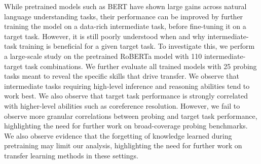 While pretrained models such as BERT have shown large gains across natural language understanding tasks, their performance can be improved by further training the model on a data-rich intermediate task, before fine-tuning it on a target task. However, it is still poorly understood when and why intermediate-task training is beneficial for a given target task. To investigate this, we perform a large-scale study on the pretrained RoBERTa model  with 110 intermediate-target task combinations. We further evaluate all trained models with 25 probing tasks meant to reveal the specific skills that drive transfer. We observe that intermediate tasks requiring high-level inference and reasoning abilities tend to work best. We also observe that target task performance is strongly correlated with higher-level abilities such as coreference resolution. However, we fail to observe more granular correlations between probing and target task performance, highlighting the need for further work on broad-coverage probing benchmarks. We also observe evidence that the forgetting of knowledge learned during pretraining may limit our analysis, highlighting the need for further work on transfer learning methods in these settings.
